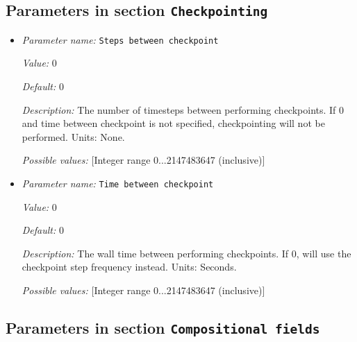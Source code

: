 \subsection{Parameters in section \tt Checkpointing}
\label{parameters:Checkpointing}

\begin{itemize}
\item {\it Parameter name:} {\tt Steps between checkpoint}


{\it Value:} 0


{\it Default:} 0


{\it Description:} The number of timesteps between performing checkpoints. If 0 and time between checkpoint is not specified, checkpointing will not be performed. Units: None.


{\it Possible values:} [Integer range 0...2147483647 (inclusive)]
\item {\it Parameter name:} {\tt Time between checkpoint}


{\it Value:} 0


{\it Default:} 0


{\it Description:} The wall time between performing checkpoints. If 0, will use the checkpoint step frequency instead. Units: Seconds.


{\it Possible values:} [Integer range 0...2147483647 (inclusive)]
\end{itemize}

\subsection{Parameters in section \tt Compositional fields}
\label{parameters:Compositional_20fields}

